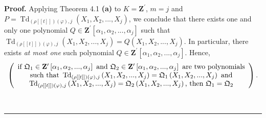 \documentclass[numbers=enddot,12pt,final,onecolumn,notitlepage]{scrartcl}%
\newenvironment{proof}[1][Proof]{\noindent\textbf{#1.} }{\ \rule{0.5em}{0.5em}}
\begin{document}
\begin{proof}
Applying Theorem 4.1 \textbf{(a)} to $K=\mathbf{Z}^{\prime}$, $m=j$ and
$P=\operatorname*{Td}\nolimits_{\left(  \rho\left[  \left[  t\right]  \right]
\right)  \left(  \varphi\right)  ,j}\left(  X_{1},X_{2},...,X_{j}\right)  $,
we conclude that there exists one and only one polynomial $Q\in\mathbf{Z}%
^{\prime}\left[  \alpha_{1},\alpha_{2},...,\alpha_{j}\right]  $ such that
$\operatorname*{Td}\nolimits_{\left(  \rho\left[  \left[  t\right]  \right]
\right)  \left(  \varphi\right)  ,j}\left(  X_{1},X_{2},...,X_{j}\right)
=Q\left(  X_{1},X_{2},...,X_{j}\right)  $. In particular, there exists
\textit{at most one} such polynomial $Q\in\mathbf{Z}^{\prime}\left[
\alpha_{1},\alpha_{2},...,\alpha_{j}\right]  $. Hence,
\begin{equation}
\left(
\begin{array}
[c]{c}%
\text{if }\mathfrak{Q}_{1}\in\mathbf{Z}^{\prime}\left[  \alpha_{1},\alpha
_{2},...,\alpha_{j}\right]  \text{ and }\mathfrak{Q}_{2}\in\mathbf{Z}^{\prime
}\left[  \alpha_{1},\alpha_{2},...,\alpha_{j}\right]  \text{ are two
polynomials}\\
\text{such that }\operatorname*{Td}\nolimits_{\left(  \rho\left[  \left[
t\right]  \right]  \right)  \left(  \varphi\right)  ,j}\left(  X_{1}%
,X_{2},...,X_{j}\right)  =\mathfrak{Q}_{1}\left(  X_{1},X_{2},...,X_{j}%
\right)  \text{ and}\\
\operatorname*{Td}\nolimits_{\left(  \rho\left[  \left[  t\right]  \right]
\right)  \left(  \varphi\right)  ,j}\left(  X_{1},X_{2},...,X_{j}\right)
=\mathfrak{Q}_{2}\left(  X_{1},X_{2},...,X_{j}\right)  \text{, then
}\mathfrak{Q}_{1}=\mathfrak{Q}_{2}%
\end{array}
\right)  . \label{10.21.pf.1}%
\end{equation}



\end{proof}
\end{document}
